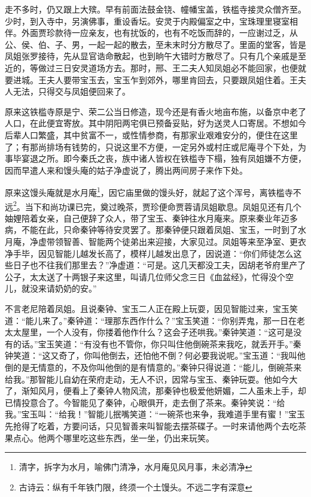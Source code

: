 \documentclass[12pt,oneside]{book}
\begin{document}
走不多时，仍又跟上大殡。早有前面法鼓金铙、幢幡宝盖，铁槛寺接灵众僧齐至。少时，到入寺中，另演佛事，重设香坛。安灵于内殿偏室之中，宝珠理里寝室相伴。外面贾珍款待一应亲友，也有扰饭的，也有不吃饭而辞的，一应谢过乏，从公、侯、伯、子、男，一起一起的散去，至未末时分方散尽了。里面的堂客，皆是凤姐张罗接待，先从显官诰命散起，也到晌午大错时方散尽了。只有几个亲戚是至近的，等做过三日安灵道场方去。那时，邢、王二夫人知凤姐必不能回家，也便就要进城。王夫人要带宝玉去，宝玉乍到郊外，哪里肯回去，只要跟凤姐住着。王夫人无法，只得交与凤姐便回来了。

原来这铁槛寺原是宁、荣二公当日修造，现今还是有香火地亩布施，以备京中老了人口，在此便宜寄放。其中阴阳两宅俱已预备妥贴，好为送灵人口寄居。不想如今后辈人口繁盛，其中贫富不一，或性情参商，有那家业艰难安分的，便住在这里了；有那尚排场有钱势的，只说这里不方便，一定另外或村庄或尼庵寻个下处，为事毕宴退之所。即今秦氏之丧，族中诸人皆权在铁槛寺下榻，独有凤姐嫌不方便，因而早遣人来和馒头庵的姑子净虚说了，腾出两间房子来作下处。

原来这馒头庵就是水月庵\footnote{清字，拆字为水月，喻佛门清净，水月庵见风月事，未必清净}，因它庙里做的馒头好，就起了这个浑号，离铁槛寺不远\footnote{古诗云：纵有千年铁门限，终须一个土馒头。不远二字有深意}。当下和尚功课已完，奠过晚茶，贾珍便命贾蓉请凤姐歇息。凤姐见还有几个妯娌陪着女亲，自己便辞了众人，带了宝玉、秦钟往水月庵来。原来秦业年迈多病，不能在此，只命秦钟等待安灵罢了。那秦钟便只跟着凤姐、宝玉，一时到了水月庵，净虚带领智善、智能两个徒弟出来迎接，大家见过。凤姐等来至净室、更衣净手毕，因见智能儿越发长高了，模样儿越发出息了，因说道：“你们师徒怎么这些日子也不往我们那里去？”净虚道：“可是。这几天都没工夫，因胡老爷府里产了公子，太太送了十两银子来这里，叫请几位师父念三日《血盆经》，忙得没个空儿，就没来请奶奶的安。”

不言老尼陪着凤姐。且说秦钟、宝玉二人正在殿上玩耍，因见智能过来，宝玉笑道：“能儿来了。”秦钟道：“理那东西作什么？”宝玉笑道：“你别弄鬼，那一日在老太太屋里，一个人没有，你搂着他作什么？这会子还哄我。”秦钟笑道：“这可是没有的话。”宝玉笑道：“有没有也不管你，你只叫住他倒碗茶来我吃，就丢开手。”秦钟笑道：“这又奇了，你叫他倒去，还怕他不倒？何必要我说呢。”宝玉道：“我叫他倒的是无情意的，不及你叫他倒的是有情意的。”秦钟只得说道：“能儿，倒碗茶来给我。”那智能儿自幼在荣府走动，无人不识，因常与宝玉、秦钟玩耍。他如今大了，渐知风月，便看上了秦钟人物风流，那秦钟也极爱他妍媚，二人虽未上手，却已情投意合了。今智能见了秦钟，心眼俱开，走去倒了茶来。秦钟笑说：“给我。”宝玉叫：“给我！”智能儿抿嘴笑道：“一碗茶也来争，我难道手里有蜜！”宝玉先抢得了吃着，方要问话，只见智善来叫智能去摆茶碟子。一时来请他两个去吃茶果点心。他两个哪里吃这些东西，坐一坐，仍出来玩笑。
\end{document}
